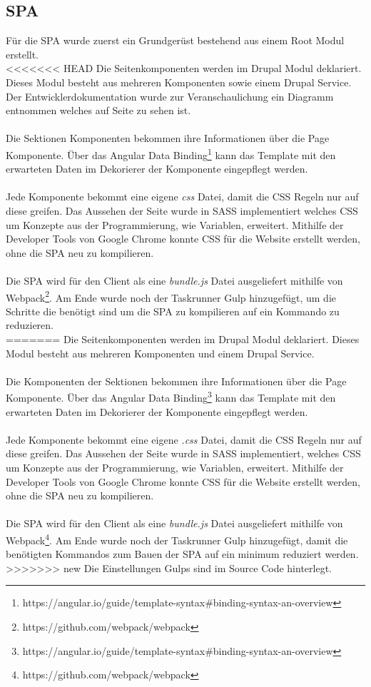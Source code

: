 \documentclass[11pt,a4paper]{article}
\begin{document}
\subsection{SPA}
Für die SPA wurde zuerst ein Grundgerüst bestehend aus einem Root Modul erstellt.\\
<<<<<<< HEAD
Die Seitenkomponenten werden im Drupal Modul deklariert.  Dieses Modul besteht aus mehreren Komponenten sowie einem Drupal Service. Der Entwicklerdokumentation wurde  zur Veranschaulichung ein Diagramm entnommen welches auf Seite  zu sehen ist. \\\\Die Sektionen Komponenten bekommen ihre Informationen über die Page Komponente. Über das Angular Data Binding\footnote{https://angular.io/guide/template-syntax\#binding-syntax-an-overview} kann das Template mit den erwarteten Daten im Dekorierer der Komponente eingepflegt werden.\\\\
Jede Komponente bekommt eine eigene \textit{css} Datei, damit die CSS Regeln nur auf diese greifen. Das Aussehen der Seite wurde in SASS implementiert welches CSS um Konzepte aus der Programmierung, wie Variablen, erweitert.
Mithilfe der Developer Tools von Google Chrome konnte CSS für die Website erstellt werden, ohne die SPA neu zu kompilieren.\\\\
Die SPA wird für den Client als eine \textit{bundle.js} Datei ausgeliefert mithilfe von Webpack\footnote{https://github.com/webpack/webpack}.
Am Ende wurde noch der Taskrunner Gulp hinzugefügt, um die Schritte die benötigt sind um die SPA zu kompilieren auf ein Kommando zu reduzieren. \\
=======
Die Seitenkomponenten werden im Drupal Modul deklariert. Dieses Modul besteht aus mehreren Komponenten und einem Drupal Service.\\\\Die Komponenten der Sektionen bekommen ihre Informationen über die Page Komponente. Über das Angular Data Binding\footnote{https://angular.io/guide/template-syntax\#binding-syntax-an-overview} kann das Template mit den erwarteten Daten im Dekorierer der Komponente eingepflegt werden.\\\\
Jede Komponente bekommt eine eigene \textit{.css} Datei, damit die CSS Regeln nur auf diese greifen. Das Aussehen der Seite wurde in SASS implementiert, welches CSS um Konzepte aus der Programmierung, wie Variablen, erweitert.
Mithilfe der Developer Tools von Google Chrome konnte CSS für die Website erstellt werden, ohne die SPA neu zu kompilieren.\\\\
Die SPA wird für den Client als eine \textit{bundle.js} Datei ausgeliefert mithilfe von Webpack\footnote{https://github.com/webpack/webpack}.
Am Ende wurde noch der Taskrunner Gulp hinzugefügt, damit die benötigten Kommandos zum Bauen der SPA auf ein minimum reduziert werden.\\
>>>>>>> new
Die Einstellungen Gulps sind im Source Code hinterlegt.
\end{document}
